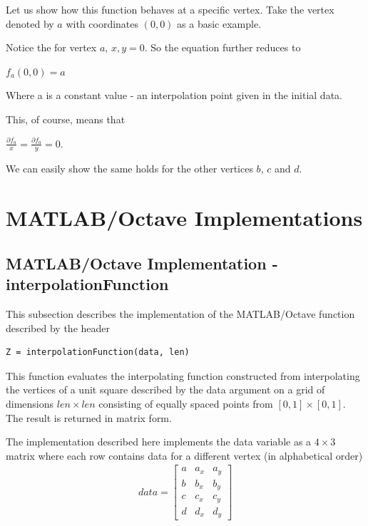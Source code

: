 \documentclass[fleqn]{article}
\begin{document}
Let us show how this function behaves at a specific vertex. Take the vertex denoted by $a$ with coordinates $(0, 0)$ as a basic example.

Notice the for vertex $a$, $x, y = 0$. So the equation further reduces to

$f_{a}(0, 0) = a$

Where a is a constant value - an interpolation point given in the initial data.

This, of course, means that

$\frac{\partial f_{a}}{x} = \frac{\partial f_{a}}{y} = 0$. 

We can easily show the same holds for the other vertices $b$, $c$ and $d$.

\section{MATLAB/Octave Implementations}

\subsection{MATLAB/Octave Implementation - interpolationFunction}

This subsection describes the implementation of the MATLAB/Octave function described by the header

\begin{tcolorbox}
\begin{verbatim}
Z = interpolationFunction(data, len)
\end{verbatim}
\end{tcolorbox}

This function evaluates the interpolating function constructed from interpolating the vertices of a unit square described by the data argument on a grid of dimensions $len \times len$ consisting of equally spaced points from $[0, 1] \times [0, 1]$. The result is returned in matrix form.

The implementation described here implements the data variable as a $4 \times 3$ matrix where each row contains data for a different vertex (in alphabetical order)
\begin{align*}
data = \begin{bmatrix} a & a_{x} & a_{y} \\ b & b_{x} & b_{y} \\ c & c_{x} & c_{y} \\ d & d_{x} & d_{y} \end{bmatrix}
\end{align*}
\end{document}
